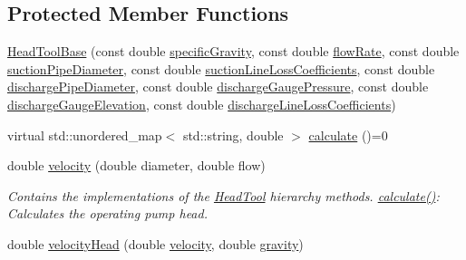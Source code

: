 \subsection*{Protected Member Functions}
\begin{DoxyCompactItemize}
\item 
\hyperlink{class_head_tool_base_ae5bb2325e1266c64b16937d964aea14f}{Head\+Tool\+Base} (const double \hyperlink{class_head_tool_base_ae5af2380fb5db2c25281ef663a5fb65f}{specific\+Gravity}, const double \hyperlink{class_head_tool_base_acf4c03cb62cbf63aba017ce063989fbc}{flow\+Rate}, const double \hyperlink{class_head_tool_base_a357365fc5ef346ce7bcb089c9d1a95e1}{suction\+Pipe\+Diameter}, const double \hyperlink{class_head_tool_base_ac74c6f6f8ab387efe7b77e0ce6ecd84e}{suction\+Line\+Loss\+Coefficients}, const double \hyperlink{class_head_tool_base_a126a397bd3d87b68864e1962c70bb45e}{discharge\+Pipe\+Diameter}, const double \hyperlink{class_head_tool_base_a39c854f13b16967e02a67cd1aaee07c4}{discharge\+Gauge\+Pressure}, const double \hyperlink{class_head_tool_base_a9ed2160992f8da2e335d919cf9aedd08}{discharge\+Gauge\+Elevation}, const double \hyperlink{class_head_tool_base_a147c035c7422406c594c5fd42ab11eb0}{discharge\+Line\+Loss\+Coefficients})
\item 
virtual std\+::unordered\+\_\+map$<$ std\+::string, double $>$ \hyperlink{class_head_tool_base_ab8df8f908827ce45dc5e769ea0e10f0b}{calculate} ()=0
\item 
double \hyperlink{class_head_tool_base_a0412306c4adda62e5840342b0d26ac06}{velocity} (double diameter, double flow)
\begin{DoxyCompactList}\small\item\em Contains the implementations of the \hyperlink{class_head_tool}{Head\+Tool} hierarchy methods. \hyperlink{class_head_tool_base_ab8df8f908827ce45dc5e769ea0e10f0b}{calculate()}\+: Calculates the operating pump head. \end{DoxyCompactList}\item 
double \hyperlink{class_head_tool_base_a461c3d53a92763ca08c9a5bbcbef83c3}{velocity\+Head} (double \hyperlink{class_head_tool_base_a0412306c4adda62e5840342b0d26ac06}{velocity}, double \hyperlink{class_head_tool_base_a687da90a9c2f44cb51061d9fad30c002}{gravity})
\end{DoxyCompactItemize}
